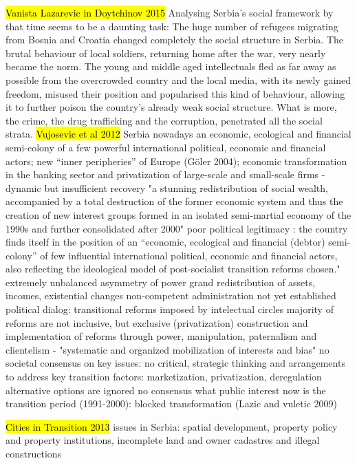 \documentclass[11pt]{report}
\begin{document}
	\hl{Vanista Lazarevic in Doytchinov 2015}
Analysing Serbia’s social framework by that time seems to be a daunting task: The  huge  number  of  refugees  migrating  from  Bosnia  and  Croatia  changed completely the social structure in Serbia. The brutal behaviour of local soldiers, returning home after the war, very nearly became the norm. The young and middle aged intellectuals fled as far away as possible from the overcrowded country  and  the  local  media,  with  its  newly  gained  freedom,  misused  their position and popularised this kind of behaviour, allowing it to further poison
the country’s already weak social structure. What is more, the crime, the drug trafficking and the corruption, penetrated all the social strata.
\hl{Vujosevic et al 2012}
Serbia nowadays an economic, ecological and financial semi-colony of a few powerful international political, economic and financial actors;  new “inner peripheries” of Europe (Göler 2004); economic transformation in the banking sector and privatization of large-scale and small-scale firms - dynamic but insufficient recovery
"a stunning redistribution of social wealth, accompanied by a total destruction of the former economic system and thus the creation of new interest groups formed in an isolated semi-martial economy of the 1990s and further consolidated after 2000"
poor political legitimacy :
	the country ﬁnds itself in the position of an “economic, ecological and financial (debtor) semi-colony” of few influential international political, economic and financial actors, also reﬂecting the ideological model of post-socialist transition reforms chosen."
	extremely unbalanced asymmetry of power
	grand redistribution of assets, incomes, existential changes
	non-competent administration
not yet established political dialog:
	transitional reforms imposed by intelectual circles
	majority of reforms are not inclusive, but exclusive (privatization)
	construction and implementation of reforms through power, manipulation, paternalism and clientelism - "systematic and organized mobilization of interests and bias"
no societal consensus on key issues:
	no critical, strategic thinking and arrangements to address key transition factors: marketization, privatization, deregulation
	alternative options are ignored
	no consensus what public interest now is
the transition period (1991-2000): blocked transformation (Lazic and vuletic 2009)

\hl{Cities in Transition 2013}
issues in Serbia: spatial development, property policy and property institutions, incomplete land and owner cadastres and illegal constructions
\end{document}
